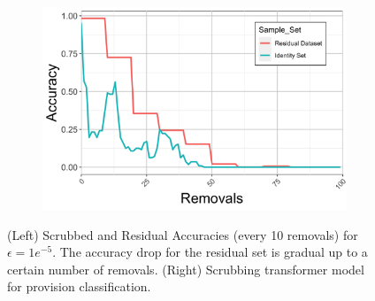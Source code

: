 \begin{figure}
\begin{subfigure}{0.45\columnwidth}\centering
    \includegraphics[width=0.98\columnwidth]{5_unlearn/figs/scrub/VGG_Scrub_1.png}%
    \label{fig:vgg}
\end{subfigure}
\begin{subfigure}{0.495\columnwidth}
    \centering
    \label{tab:nlp}
\end{subfigure}

\caption[important image]{(Left) Scrubbed and Residual Accuracies (every 10 removals) for $\epsilon = 1e^{-5}$. The accuracy drop for the residual set is gradual up to a certain number of removals. (Right) Scrubbing transformer model for provision classification.}
\label{fig:combine}
\vspace{-5pt}
\end{figure}

